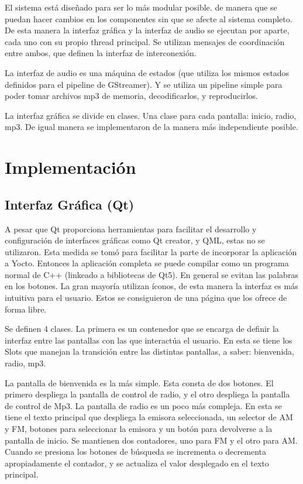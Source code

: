 El sistema está diseñado para ser lo más modular posible. de manera que se puedan hacer cambios en
los componentes sin que se afecte al sistema completo. De esta manera la interfaz gráfica y la
interfaz de audio se ejecutan por aparte, cada uno con su propio thread principal. Se utilizan
mensajes de coordinación entre ambos, que definen la interfaz de interconexión.

La interfaz de audio es una máquina de estados (que utiliza los mismos estados definidos para el
pipeline de GStreamer). Y se utiliza un pipeline simple para poder tomar archivos mp3 de memoria,
decodificarlos, y reproducirlos.

La interfaz gráfica se divide en clases. Una clase para cada pantalla: inicio, radio, mp3. De igual
manera se implementaron de la manera más independiente posible. 

\section{Implementación}
\label{sec:implementation}
\subsection{Interfaz Gráfica (Qt)}
\label{sec:qt}

A pesar que Qt proporciona herramientas para facilitar el desarrollo y configuración de interfaces
gráficas como Qt creator, y QML, estas no se utilizaron. Esta medida se tomó para facilitar la parte
de incorporar la aplicación a Yocto. Entonces la aplicación completa se puede compilar como un
programa normal de C++ (linkeado a bibliotecas de Qt5). En general se evitan las palabras en los
botones. La gran mayoría utilizan íconos, de esta manera la interfaz es más intuitiva para el
usuario. Estos se consiguieron de una página que los ofrece de forma libre. %

Se definen 4 clases. La primera es un contenedor que se encarga de definir la interfaz entre las
pantallas con las que interactúa el usuario. En esta se tiene los Slots que manejan la transición
entre las distintas pantallas, a saber: bienvenida, radio, mp3.

La pantalla de bienvenida es la más simple. Esta consta de dos botones. El primero despliega la
pantalla de control de radio, y el otro despliega la pantalla de control de Mp3. La pantalla de
radio es un poco más compleja. En esta se tiene el texto principal que despliega la emisora
seleccionada, un selector de AM y FM, botones para seleccionar la emisora y un botón para devolverse
a la pantalla de inicio. Se mantienen dos contadores, uno para FM y el otro para AM. Cuando se
presiona los botones de búsqueda se incrementa o decrementa apropiadamente el contador, y se
actualiza el valor desplegado en el texto principal.

